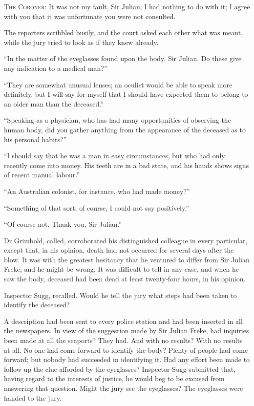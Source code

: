 \textsc{The Coroner}: It was not my fault, Sir Julian; I had nothing to do with it; I agree with you that it was unfortunate you were not consulted.

The reporters scribbled busily, and the court asked each other what was meant, while the jury tried to look as if they knew already.

\enquote{In the matter of the eyeglasses found upon the body, Sir Julian. Do these give any indication to a medical man?}

\enquote{They are somewhat unusual lenses; an oculist would be able to speak more definitely, but I will say for myself that I should have expected them to belong to an older man than the deceased.}

\enquote{Speaking as a physician, who has had many opportunities of observing the human body, did you gather anything from the appearance of the deceased as to his personal habits?}

\enquote{I should say that he was a man in easy circumstances, but who had only recently come into money. His teeth are in a bad state, and his hands shows signs of recent manual labour.}

\enquote{An Australian colonist, for instance, who had made money?}

\enquote{Something of that sort; of course, I could not say positively.}

\enquote{Of course not. Thank you, Sir Julian.}

Dr Grimbold, called, corroborated his distinguished colleague in every particular, except that, in his opinion, death had not occurred for several days after the blow. It was with the greatest hesitancy that he ventured to differ from Sir Julian Freke, and he might be wrong. It was difficult to tell in any case, and when he saw the body, deceased had been dead at least twenty-four hours, in his opinion.

Inspector Sugg, recalled. Would he tell the jury what steps had been taken to identify the deceased?

A description had been sent to every police station and had been inserted in all the newspapers. In view of the suggestion made by Sir Julian Freke, had inquiries been made at all the seaports? They had. And with no results? With no results at all. No one had come forward to identify the body? Plenty of people had come forward; but nobody had succeeded in identifying it. Had any effort been made to follow up the clue afforded by the eyeglasses? Inspector Sugg submitted that, having regard to the interests of justice, he would beg to be excused from answering that question. Might the jury see the eyeglasses? The eyeglasses were handed to the jury.

